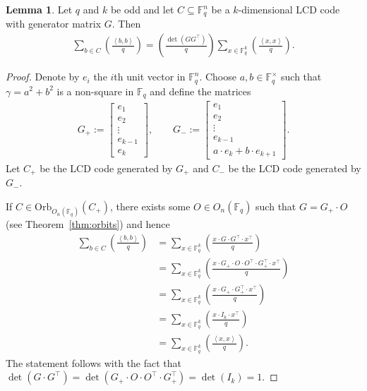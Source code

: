 \documentclass[11pt]{article}
\theoremstyle{definition}
\newtheorem{lemma}[theorem]{Lemma}
\newcommand{\F}{\mathbb{F}}
\newcommand{\Leg}[2]{\left(\frac{#1}{#2}\right)}                       %
\newcommand{\Orb}{\mathrm{Orb}}
\newcommand{\Ang}[1]{\left\langle#1\right\rangle}
\newcommand{\Ort}{O}
\begin{document}
\begin{lemma}\label{lem:character-sum-odd-code}
	Let $q$ and $k$ be odd and let $C \subseteq \F_q^n$ be a $k$-dimensional LCD code with generator matrix $G$.
	Then
	\begin{align*}
		\sum_{b \in C} \Leg{\Ang{b, b}}{q}
		= \Leg{\det(G G^\top)}{q} \sum_{x \in \F_q^k} \Leg{\Ang{x, x}}{q}.
	\end{align*}
\end{lemma}

\begin{proof}
	Denote by $e_i$ the $i$th unit vector in $\F_q^n$.
	Choose $a, b \in \F_q^\times$ such that $\gamma = a^2 + b^2$ is a non-square in $\F_q$ and define the matrices
	\begin{align*}
		G_+ := \begin{bmatrix}
			e_1 \\
			e_2 \\
			\vdots \\
			e_{k - 1} \\
			e_k
		\end{bmatrix},
		\qquad
		G_- := \begin{bmatrix}
			e_1 \\
			e_2 \\
			\vdots \\
			e_{k - 1} \\
			a \cdot e_k + b \cdot e_{k + 1}
		\end{bmatrix}.
	\end{align*}
	Let $C_+$ be the LCD code generated by $G_+$ and $C_-$ be the LCD code generated by $G_-$.

	If $C \in \Orb_{\Ort_n(\F_q)}(C_+)$, there exists some $O \in \Ort_n(\F_q)$ such that $G = G_+ \cdot O$ (see Theorem~\ref{thm:orbits}) and hence
	\begin{align*}
		\sum_{b \in C} \Leg{\Ang{b, b}}{q}
		&= \sum_{x \in \F_q^k} \Leg{x \cdot G \cdot G^\top \cdot x^\top}{q} \\
		&= \sum_{x \in \F_q^k} \Leg{x \cdot G_+ \cdot O \cdot O^\top \cdot G_+^\top \cdot x^\top}{q} \\
		&= \sum_{x \in \F_q^k} \Leg{x \cdot G_+ \cdot G_+^\top \cdot x^\top}{q} \\
		&= \sum_{x \in \F_q^k} \Leg{x \cdot I_k \cdot x^\top}{q} \\
		&= \sum_{x \in \F_q^k} \Leg{\Ang{x, x}}{q} .
	\end{align*}
	The statement follows with the fact that $\det(G \cdot G^\top) = \det(G_+ \cdot O \cdot O^\top \cdot G_+^\top) = \det(I_k) = 1$.


\end{proof}
\end{document}
